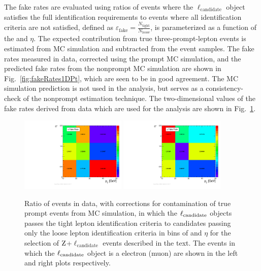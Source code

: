 The fake rates are evaluated 
using ratios of events where the $\ell_{\mathrm{candidate}}$ 
object satisfies the full identification requirements 
to events where all identification criteria are not satisfied, defined as
$\varepsilon_{\text{fake}} = \frac{N_{\text{tight}}}{N_\text{loose}}$,
is parameterized as a function of the {\lcand} \PT and $\eta$. 
The expected contribution from true three-prompt-lepton events is
estimated from MC simulation and subtracted from the event samples.
The fake rates measured in data, corrected using the prompt MC simulation,
and the predicted fake rates from the nonprompt MC simulation are shown in
Fig.~\ref{fig:fakeRates1DPt}, which are seen to be in good agreement.
The MC simulation prediction is not used in the analysis, but serves as a consistency-check
of the nonprompt estimation technique.
The two-dimensional values of the fake rates derived from data which are used for
the analysis are shown in Fig.~\ref{fig:fakeRates2D}.

\begin{figure}[htbp]
  \centering
   \includegraphics[width=0.45\textwidth]{figures/AnalysisProcedure/ratio2D_allE.pdf}
   \includegraphics[width=0.45\textwidth]{figures/AnalysisProcedure/ratio2D_allMu.pdf}
  \caption{
    Ratio of events in data, with corrections for contamination of true prompt events from MC simulation,
    in which the $\ell_{\rm candidate}$ objects passes the tight lepton 
    identification criteria to candidates passing only the loose lepton identification 
    criteria in bins of \PT and $\eta$ for the selection of $\mathrm{Z}$+$\ell_{\mathrm{candidate}}$ 
    events described in the text.
    The events in which the $\ell_{\rm candidate}$ object is a electron (muon) are shown in 
    the left and right plots respectively. 
        }
 \label{fig:fakeRates2D}
\end{figure}



